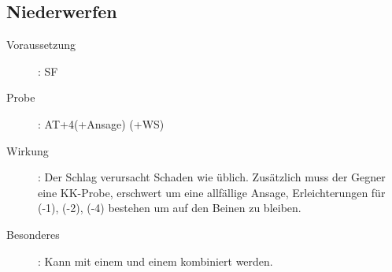 \subsection{Niederwerfen}
\label{aktion.niederwerfen}
\begin{description}
    \item[Voraussetzung]:
        SF 
    \item[Probe]:
        AT+4(+Ansage) (+WS)
    \item[Wirkung]:
        Der Schlag verursacht Schaden wie üblich.
        Zusätzlich muss der Gegner eine KK-Probe, erschwert um eine allfällige Ansage, Erleichterungen für  (-1),  (-2),  (-4) bestehen um auf den Beinen zu bleiben.
    \item[Besonderes]:
        Kann mit einem  und einem  kombiniert werden.
\end{description}
